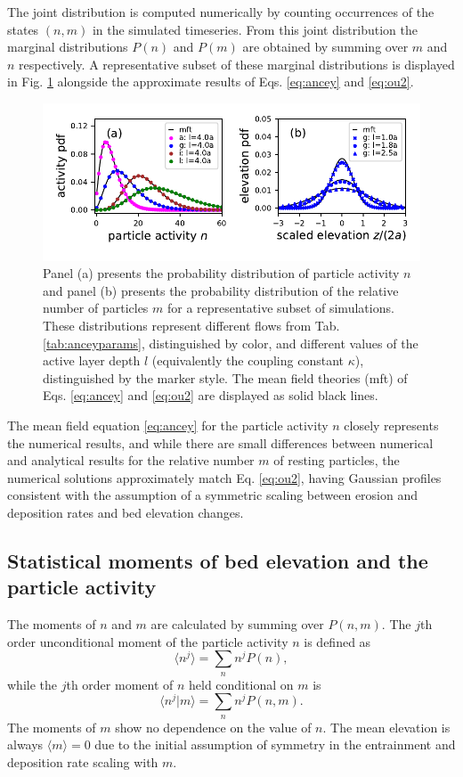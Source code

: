 The joint distribution is computed numerically by counting occurrences of the states $(n,m)$ in the simulated timeseries.
From this joint distribution the marginal distributions $P(n)$ and $P(m)$ are obtained by summing over $m$ and $n$ respectively.
A representative subset of these marginal distributions is displayed in Fig. \ref{fig:pdfs} alongside the approximate results of Eqs. \ref{eq:ancey} and \ref{eq:ou2}.
\begin{figure}[!htbp]
	\includegraphics[width=\linewidth,keepaspectratio]{./figures/ch3/distributions.pdf}
	\caption{Panel (a) presents the probability distribution of particle activity $n$ and panel (b) presents the probability distribution of the relative number of particles $m$ for a representative subset of simulations. These distributions represent different flows from Tab. \ref{tab:anceyparams}, distinguished by color, and different values of the active layer depth $l$ (equivalently the coupling constant $\kappa$), distinguished by the marker style. The mean field theories (mft) of Eqs. \ref{eq:ancey} and \ref{eq:ou2} are displayed as solid black lines.}
	\label{fig:pdfs}
\end{figure}
The mean field equation \ref{eq:ancey} for the particle activity $n$ closely represents the numerical results, and while there are small differences between numerical and analytical results for the relative number $m$ of resting particles, the numerical solutions approximately match Eq. \ref{eq:ou2}, having Gaussian profiles consistent with the assumption of a symmetric scaling between erosion and deposition rates and bed elevation changes. 


\subsection{Statistical moments of bed elevation and the particle activity}
\label{sec:elemom}

The moments of $n$ and $m$ are calculated by summing over $P(n,m)$. 
The $j$th order unconditional moment of the particle activity $n$ is defined as
\begin{equation} \langle n^j \rangle = \sum_{n}n^jP(n),\end{equation}
while the $j$th order moment of $n$ held conditional on $m$ is
\begin{equation} \langle n^j|m \rangle = \sum_{n}n^j P(n,m) .\end{equation}
The moments of $m$ show no dependence on the value of $n$. 
The mean elevation is always $\langle m \rangle = 0 $ due to the initial assumption of symmetry in the entrainment and deposition rate scaling with $m$. 

